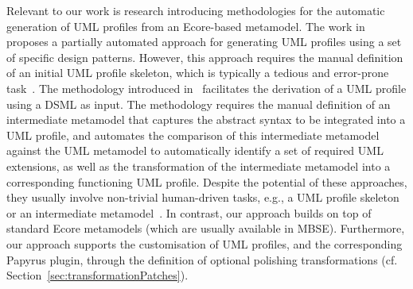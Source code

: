 Relevant to our work is research introducing methodologies for the automatic 
generation of UML profiles from an Ecore-based metamodel. 
The work in~\cite{Lagarde2008:FASE} proposes a partially automated approach for 
generating UML profiles using a set of specific design patterns. However, this 
approach requires the manual definition of an initial UML profile skeleton, 
which is typically a tedious and error-prone task~\cite{Wimmer2009:IJWIS}. 
The methodology introduced in~\cite{Giachetti2008:ER,Giachetti2009:CAISE} 
facilitates the derivation of a UML profile using a DSML as input. 
The methodology requires the manual definition of an intermediate metamodel 
that captures the abstract syntax to be integrated into a UML profile, and 
automates the comparison of this intermediate metamodel against the UML 
metamodel to automatically identify a set of required UML extensions, as well 
as the transformation of the intermediate metamodel into a corresponding 
functioning UML profile. 
Despite the potential of these approaches, they usually involve
non-trivial human-driven tasks, e.g., a UML profile 
skeleton~\cite{Lagarde2008:FASE} or an intermediate 
metamodel~\cite{Giachetti2008:ER,Giachetti2009:CAISE}. In contrast, our 
approach builds on top of standard Ecore metamodels (which are usually 
available in MBSE). Furthermore, our approach supports the customisation of  
UML profiles, and the corresponding Papyrus plugin, through the definition of 
optional polishing transformations (cf. 
Section~\ref{sec:transformationPatches}).





